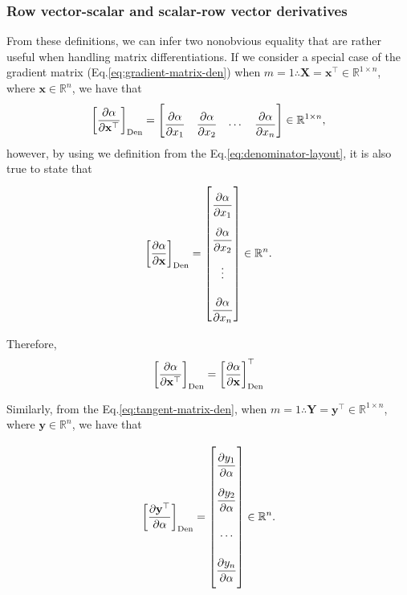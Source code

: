 \documentclass{article}
\begin{document}
\subsubsection{Row vector-scalar and scalar-row vector derivatives}

From these definitions, we can infer two nonobvious equality that are rather useful when handling matrix differentiations. If we consider a special case of the gradient matrix (Eq.\eqref{eq:gradient-matrix-den}) when $m=1 \therefore \mathbf{X} = \mathbf{x}^\top \in \mathbb{R}^{1\times n}$, where $\mathbf{x} \in \mathbb{R}^n$, we have that
\begin{align}
    \left[\dfrac{\partial \alpha}{\partial \mathbf{x}^\top}\right]_{\textnormal{Den}} = \begin{bmatrix} \dfrac{\partial \alpha}{\partial x_{1}} &
        \dfrac{\partial \alpha}{\partial x_{2}} &
        \cdots &
        \dfrac{\partial \alpha}{\partial x_{n}} \end{bmatrix} \in \mathbb{R}^{1\times n},
\end{align}
however, by using we definition from the Eq.\eqref{eq:denominator-layout}, it is also true to state that
\begin{align}
    \left[\dfrac{\partial \alpha}{\partial \mathbf{x}}\right]_{\textnormal{Den}} = \begin{bmatrix} \dfrac{\partial \alpha}{\partial x_{1}} \\
        \dfrac{\partial \alpha}{\partial x_{2}} \\
        \vdots \\
        \dfrac{\partial \alpha}{\partial x_{n}} \end{bmatrix} \in \mathbb{R}^{n}.
\end{align}

Therefore,
\begin{align}
    \label{eq:hidden-den}
    \left[\dfrac{\partial \alpha}{\partial \mathbf{x}^\top}\right]_{\textnormal{Den}} = \left[\dfrac{\partial \alpha}{\partial \mathbf{x}}\right]_{\textnormal{Den}}^\top
\end{align}

Similarly, from the Eq.\eqref{eq:tangent-matrix-den}, when $m=1 \therefore \mathbf{Y} = \mathbf{y}^\top \in \mathbb{R}^{1\times n}$, where $\mathbf{y} \in \mathbb{R}^n$, we have that

\begin{align}
    \left[\dfrac{\partial \mathbf{y}^\top}{\partial \alpha}\right]_{\textnormal{Den}} = \renewcommand{\arraystretch}{2.6}\begin{bmatrix}
        \dfrac{\partial y_{1}}{\partial \alpha} \\
        \dfrac{\partial y_{2}}{\partial \alpha} \\
        \cdots \\
        \dfrac{\partial y_{n}}{\partial \alpha}\vspace{1.3ex}
    \end{bmatrix} \in \mathbb{R}^{n}.
\end{align}
\end{document}
